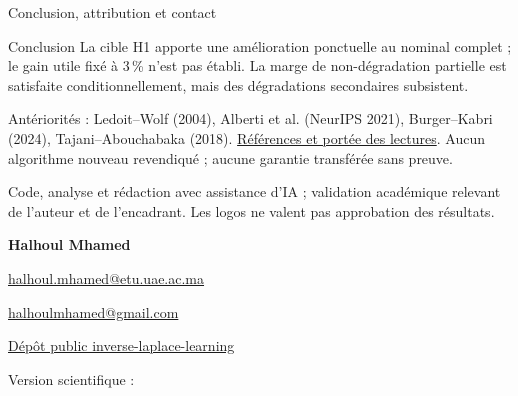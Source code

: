 \documentclass[aspectratio=169,10pt]{beamer}
\newcommand{\src}[2]{\href{\DataURL{#1}}{#2}}
\begin{document}
\begin{frame}{Conclusion, attribution et contact}
\begin{block}{Conclusion}
La cible H1 apporte une amélioration ponctuelle au nominal complet ; le gain utile fixé à 3\,\% n'est pas établi. La marge de non-dégradation partielle est satisfaite conditionnellement, mais des dégradations secondaires subsistent.
\end{block}
\small
Antériorités : Ledoit--Wolf (2004), Alberti et al. (NeurIPS 2021), Burger--Kabri (2024), Tajani--Abouchabaka (2018). \src{SOURCES.md}{Références et portée des lectures}. Aucun algorithme nouveau revendiqué ; aucune garantie transférée sans preuve.
\par\vspace{2mm}
Code, analyse et rédaction avec assistance d'IA ; validation académique relevant de l'auteur et de l'encadrant. Les logos ne valent pas approbation des résultats.
\par\vspace{2mm}
\textbf{Halhoul Mhamed}\par
\href{mailto:halhoul.mhamed@etu.uae.ac.ma}{halhoul.mhamed@etu.uae.ac.ma}\par
\href{mailto:halhoulmhamed@gmail.com}{halhoulmhamed@gmail.com}\par
\href{https://github.com/halhoulmhamed-droid/inverse-laplace-learning}{Dépôt public inverse-laplace-learning}\par
\par\vspace{2mm}
{\tiny Version scientifique : \texttt{\DataCommit}}
\end{frame}
\end{document}
